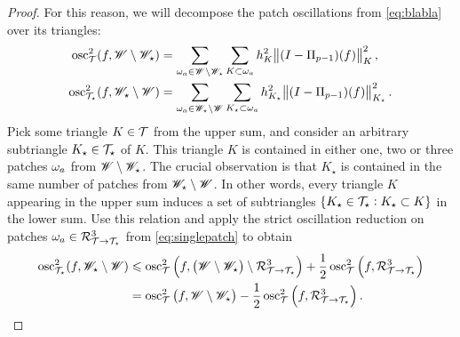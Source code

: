 \documentclass[thesis.tex]{subfiles}
\begin{document}
\begin{proof}
  For this reason, we will decompose the patch oscillations from \eqref{eq:blabla} over its triangles:
  \begin{align*}
    \operatorname{osc}_{\mathcal{T}}^2(f, \mathscr{W} \setminus \mathscr{W}_\star)  &= \sum_{\omega_a \in \mathscr{W} \setminus \mathscr{W}_\star} \sum_{K \subset \omega_a} h_{K}^2 \norm{(I-\Pi_{p-1})(f)}^2_{K}, \\
    \operatorname{osc}_{\mathcal{T}_\star}^2(f, \mathscr{W}_\star \setminus \mathscr{W})  &= \sum_{\omega_a \in \mathscr{W}_\star \setminus \mathscr{W}} \sum_{K_\star \subset \omega_a} h_{K_\star}^2 \norm{(I-\Pi_{p-1})(f)}^2_{K_\star}.
  \end{align*}
  Pick some triangle $K \in \mathcal{T}$ from the upper sum, and consider an arbitrary subtriangle $K_\star \in \mathcal{T}_\star$ of $K$.
  This triangle $K$ is contained in either one, two or three patches $\omega_a$ from $\mathscr{W} \setminus \mathscr{W}_\star$. The
  crucial observation is that $K_\star$ is contained in the same number of patches from $\mathscr{W}_\star \setminus \mathscr{W}$.
  In other words, every triangle $K$ appearing in the
  upper sum induces a set of subtriangles $\set{K_\star \in \mathcal{T}_\star : K_\star \subset K}$ in the lower sum.
  Use this relation and apply the strict oscillation reduction on patches $\omega_a \in \mathcal{R}^3_{\mathcal{T} \to \mathcal{T}_\star}$ from \eqref{eq:singlepatch}
  to obtain
  \begin{align*}
    \operatorname{osc}^2_{\mathcal{T}_\star}(f, \mathscr{W}_\star \setminus \mathscr{W}) &\leqslant \operatorname{osc}^2_{\mathcal{T}}\left(f, \left(\mathscr{W} \setminus \mathscr{W}_\star\right)\setminus \mathcal{R}^3_{\mathcal{T} \to \mathcal{T}_\star}\right) + \frac{1}{2} \operatorname{osc}^2_{\mathcal{T}}\left(f, \mathcal{R}^3_{\mathcal{T} \to \mathcal{T}_\star}\right)\\
    &= \operatorname{osc}_{\mathcal{T}}^2\left(f, \mathscr{W} \setminus \mathscr{W}_\star\right) - \frac{1}{2} \operatorname{osc}^2_{\mathcal{T}}\left(f, \mathcal{R}^3_{\mathcal{T} \to \mathcal{T}_\star}\right).\qedhere
  \end{align*}
\end{proof}
\end{document}
